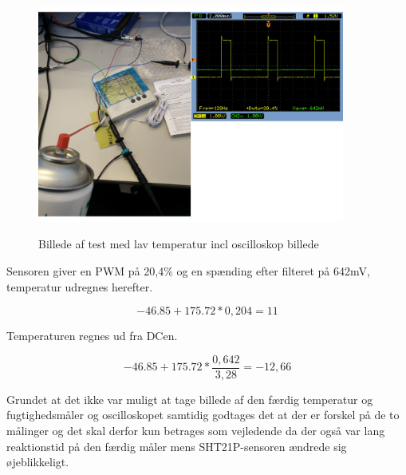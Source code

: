 \begin{figure}[h]
\centering
{\includegraphics[width=0.90\textwidth]{filer/modultest/Billeder/test_kold}}
\caption{Billede af test med lav temperatur incl oscilloskop billede}
\label{lab:test_kold}
\end{figure}

Sensoren giver en PWM på 20,4\% og en spænding efter filteret på 642mV, temperatur udregnes herefter.

\begin{equation}
-46.85+175.72*0,204=11
\end{equation}

Temperaturen regnes ud fra DCen. 

\begin{equation}
-46.85+175.72*\frac{0,642}{3,28}=-12,66
\end{equation}

Grundet at det ikke var muligt at tage billede af den færdig temperatur og fugtighedsmåler og oscilloskopet samtidig godtages det at der er forskel på de to målinger og det skal derfor kun betrages som vejledende da der også var lang reaktionstid på den færdig måler mens SHT21P-sensoren ændrede sig øjeblikkeligt.
